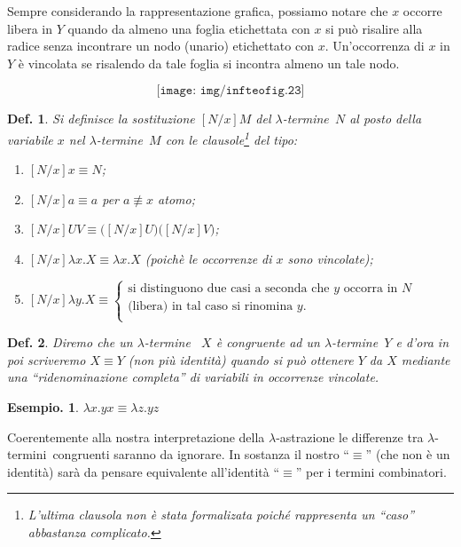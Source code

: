 \documentclass{book}
\newtheorem{definizione}{Def.}[chapter]
\newtheorem{esempio}{Esempio.}
\newcommand*{\lbt}{$\lambda$-ter\-mi\-ne}
\newcommand*{\lbts}{$\lambda$-ter\-mi\-ni}
\begin{document}
Sempre considerando la rappresentazione grafica, 
possiamo notare che $x$ 
occorre libera in $Y$ quando da almeno una foglia etichettata con $x$ si pu\`o
risalire alla radice senza incontrare un nodo  (unario) etichettato con $x$.
Un'occorrenza di $x$ in $Y$ \`e vincolata se risalendo da tale foglia si
incontra almeno un tale nodo.

\[\texttt{[image: img/infteofig.23]}\]

\begin{definizione}
Si definisce la \emph{sostituzione} $[N/x]M$ \emph{del} \lbt ~$N$ \emph{al
posto} della variabile $x$ \emph{nel} \lbt ~$M$ con le clausole\footnote{
L'ultima clausola non \`e stata formalizata poich\'e rappresenta
un ``caso'' abbastanza complicato.} del tipo:
\begin{enumerate}
\item[-]$[N/x]x \equiv N$;
\item[-]$[N/x]a \equiv a$ per $a \not\equiv x$ atomo;
\item[-]$[N/x]UV \equiv \bigl([N/x]U\bigr)\bigl([N/x]V\bigr)$;
\item[-]$[N/x]\lambda x.X \equiv \lambda x.X$ (poich\`e le occorrenze di $x$ 
  sono vincolate);
\item[-]$[N/x]\lambda y.X \equiv \left\{ \begin{array}{l}
                      \text{si distinguono due casi a seconda che } y 
		      \text{ occorra in } N  \\
		      \text{(libera) in tal caso si rinomina } y. \\
		    \end{array} \right.$

\end{enumerate} 
\end{definizione}

\begin{definizione}
Diremo che un \lbt ~ $X$ \`e congruente ad un \lbt ~$Y$ e d'ora in poi 
scriveremo $X \equiv Y$ (non pi\`u identit\`a) quando si pu\`o ottenere $Y$ da
$X$ mediante una ``ridenominazione completa'' di variabili in occorrenze 
vincolate.
\end{definizione}
\begin{esempio}
$\lambda x.yx \equiv \lambda z.yz$
\end{esempio}
Coerentemente alla nostra interpretazione della $\lambda$-astrazione le
differenze tra \lbts ~congruenti saranno da ignorare. In sostanza il nostro
``$\equiv$'' (che non \`e un identit\`a) sar\`a da pensare equivalente 
all'identit\`a ``$\equiv$'' per i termini combinatori.
\end{document}
